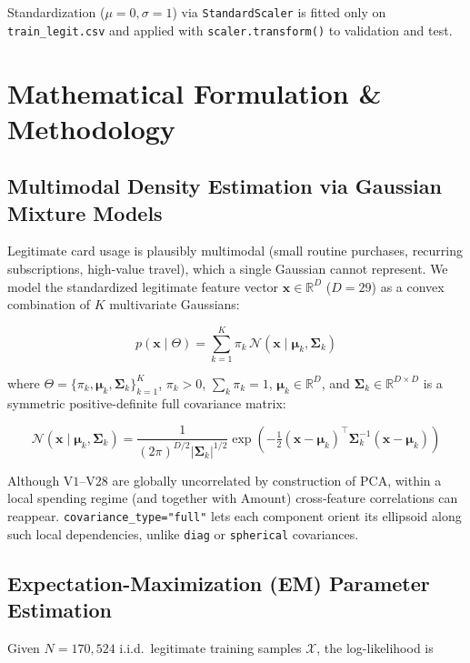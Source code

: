 \documentclass[11pt, a4paper]{article}
\begin{document}
Standardization ($\mu = 0, \sigma = 1$) via \texttt{StandardScaler} is fitted only on \texttt{train\_legit.csv} and applied with \texttt{scaler.transform()} to validation and test.

\section{Mathematical Formulation \& Methodology}

\subsection{Multimodal Density Estimation via Gaussian Mixture Models}
Legitimate card usage is plausibly multimodal (small routine purchases, recurring subscriptions, high-value travel), which a single Gaussian cannot represent. We model the standardized legitimate feature vector $\mathbf{x} \in \mathbb{R}^{D}$ ($D = 29$) as a convex combination of $K$ multivariate Gaussians:

\begin{equation}
p(\mathbf{x} \mid \Theta) = \sum_{k=1}^{K} \pi_k \, \mathcal{N}(\mathbf{x} \mid \boldsymbol{\mu}_k, \boldsymbol{\Sigma}_k)
\end{equation}

where $\Theta = \{\pi_k, \boldsymbol{\mu}_k, \boldsymbol{\Sigma}_k\}_{k=1}^{K}$, $\pi_k > 0$, $\sum_k \pi_k = 1$, $\boldsymbol{\mu}_k \in \mathbb{R}^{D}$, and $\boldsymbol{\Sigma}_k \in \mathbb{R}^{D \times D}$ is a symmetric positive-definite full covariance matrix:

\begin{equation}
\mathcal{N}(\mathbf{x} \mid \boldsymbol{\mu}_k, \boldsymbol{\Sigma}_k) = \frac{1}{(2\pi)^{D/2} |\boldsymbol{\Sigma}_k|^{1/2}} \exp \left( -\tfrac{1}{2} (\mathbf{x} - \boldsymbol{\mu}_k)^{\top} \boldsymbol{\Sigma}_k^{-1} (\mathbf{x} - \boldsymbol{\mu}_k) \right)
\end{equation}

Although $\text{V1}$--$\text{V28}$ are globally uncorrelated by construction of PCA, within a local spending regime (and together with $\text{Amount}$) cross-feature correlations can reappear. \texttt{covariance\_type="full"} lets each component orient its ellipsoid along such local dependencies, unlike \texttt{diag} or \texttt{spherical} covariances.

\subsection{Expectation-Maximization (EM) Parameter Estimation}
Given $N = 170{,}524$ i.i.d.\ legitimate training samples $\mathcal{X}$, the log-likelihood is
\end{document}
